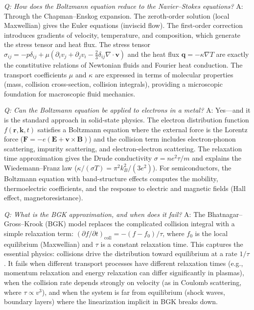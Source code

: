 \textit{Q: How does the Boltzmann equation reduce to the Navier--Stokes equations?}
A: Through the Chapman--Enskog expansion. The zeroth-order solution (local Maxwellian) gives the Euler equations (inviscid flow). The first-order correction introduces gradients of velocity, temperature, and composition, which generate the stress tensor and heat flux. The stress tensor $\sigma_{ij} = -p\delta_{ij} + \mu(\partial_i v_j + \partial_j v_i - \frac{2}{3}\delta_{ij}\nabla\cdot\mathbf{v})$ and the heat flux $\mathbf{q} = -\kappa\nabla T$ are exactly the constitutive relations of Newtonian fluids and Fourier heat conduction. The transport coefficients $\mu$ and $\kappa$ are expressed in terms of molecular properties (mass, collision cross-section, collision integrals), providing a microscopic foundation for macroscopic fluid mechanics.

\textit{Q: Can the Boltzmann equation be applied to electrons in a metal?}
A: Yes---and it is the standard approach in solid-state physics. The electron distribution function $f(\mathbf{r}, \mathbf{k}, t)$ satisfies a Boltzmann equation where the external force is the Lorentz force ($\mathbf{F} = -e(\mathbf{E} + \mathbf{v}\times\mathbf{B})$) and the collision term includes electron-phonon scattering, impurity scattering, and electron-electron scattering. The relaxation time approximation gives the Drude conductivity $\sigma = ne^2\tau/m$ and explains the Wiedemann--Franz law ($\kappa/(\sigma T) = \pi^2 k_B^2/(3e^2)$). For semiconductors, the Boltzmann equation with band-structure effects computes the mobility, thermoelectric coefficients, and the response to electric and magnetic fields (Hall effect, magnetoresistance).

\textit{Q: What is the BGK approximation, and when does it fail?}
A: The Bhatnagar--Gross--Krook (BGK) model replaces the complicated collision integral with a simple relaxation term: $(\partial f/\partial t)_{\text{coll}} = -(f - f_0)/\tau$, where $f_0$ is the local equilibrium (Maxwellian) and $\tau$ is a constant relaxation time. This captures the essential physics: collisions drive the distribution toward equilibrium at a rate $1/\tau$. It fails when different transport processes have different relaxation times (e.g., momentum relaxation and energy relaxation can differ significantly in plasmas), when the collision rate depends strongly on velocity (as in Coulomb scattering, where $\tau \propto v^3$), and when the system is far from equilibrium (shock waves, boundary layers) where the linearization implicit in BGK breaks down.
